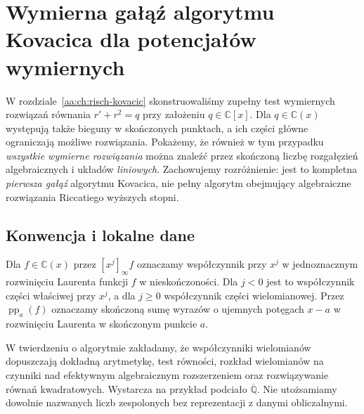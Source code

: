 \chapter{Wymierna gałąź algorytmu Kovacica dla potencjałów wymiernych}
\label{aa:ch:kovacic-rational-potential}

W rozdziale~\ref{aa:ch:risch-kovacic} skonstruowaliśmy
zupełny test wymiernych rozwiązań równania
$r'+r^2=q$ przy założeniu $q\in\mathbb C[x]$.
Dla $q\in\mathbb C(x)$ występują także bieguny
w skończonych punktach, a ich części główne
ograniczają możliwe rozwiązania.
Pokażemy, że również w tym przypadku
\emph{wszystkie wymierne rozwiązania}
można znaleźć przez skończoną liczbę
rozgałęzień algebraicznych i układów
\emph{liniowych}.
Zachowujemy rozróżnienie:
jest to kompletna \emph{pierwsza gałąź}
algorytmu Kovacica, nie pełny algorytm
obejmujący algebraiczne rozwiązania
Riccatiego wyższych stopni.

\section{Konwencja i lokalne dane}

\begin{definicja}
\label{aa:def:kov-rational-laurent}
Dla $f\in\mathbb C(x)$ przez
$[x^j]_\infty f$ oznaczamy
współczynnik przy $x^j$
w jednoznacznym rozwinięciu
Laurenta funkcji $f$ w nieskończoności.
Dla $j<0$ jest to współczynnik
części właściwej przy
$x^j$, a dla $j\ge0$
współczynnik części wielomianowej.
Przez $\operatorname{pp}_a(f)$
oznaczamy skończoną sumę wyrazów
o ujemnych potęgach $x-a$
w rozwinięciu Laurenta
w skończonym punkcie $a$.
\end{definicja}

\begin{uwaga}
\label{aa:uw:kov-rational-effective}
W twierdzeniu o algorytmie zakładamy,
że współczynniki wielomianów
dopuszczają dokładną arytmetykę,
test równości, rozkład wielomianów
na czynniki nad efektywnym
algebraicznym rozszerzeniem
oraz rozwiązywanie równań
kwadratowych. Wystarcza
na przykład podciało
$\overline{\mathbb Q}$.
Nie utożsamiamy dowolnie
nazwanych liczb zespolonych
bez reprezentacji z danymi
obliczalnymi.
\end{uwaga}

